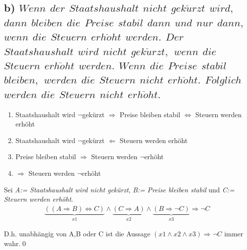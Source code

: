 \documentclass[titlepage]{article}
\newcommand{\1}{\mathbb{1}}
\newcommand{\0}{\mathbb{0}}
\begin{document}
		\subsection*{b) \textit{$Wenn$ $der$ $Staatshaushalt$ $nicht$ $gek\ddot urzt$ $wird,$ $dann$ $bleiben$ $die$ $Preise$ $stabil$ $dann$ $und$ $nur$ $dann,$ $wenn$ $die$ $Steuern$ $erh\ddot oht$ $werden.$ $Der$ $Staatshaushalt$ $wird$ $nicht$ $gek\ddot urzt,$ $wenn$ $die$ $Steuern$ $erh\ddot oht$ $werden.$ $Wenn$ $die$ $Preise$ $stabil$ $bleiben,$ $werden$ $die$ $Steuern$ $nicht$ $erh\ddot oht.$ $Folglich$ $werden$ $die$ $Steuern$ $nicht$ $erh\ddot oht.$}}
			\begin{enumerate}
				\item Staatshaushalt wird $\neg$gekürzt $\Rightarrow$ Preise bleiben stabil $\Leftrightarrow$ Steuern werden erhöht
				\item Staatshaushalt wird $\neg$gekürzt $\Leftarrow$ Steuern werden erhöht
				\item Preise bleiben stabil $\Rightarrow$ Steuern werden $\neg$erhöht
				\item $\Longrightarrow$ Steuern werden $\neg$erhöht
			\end{enumerate}
		Sei \textit{A:= Staatshaushalt wird nicht gekürzt}, \textit{B:= Preise bleiben stabil} und \textit{C:= Steuern werden erhöht}.
		\begin{align*}
			\underbrace{((A\Rightarrow B)\Leftrightarrow C)}_{x1}\wedge\underbrace{( C\Rightarrow A)}_{x2}\wedge\underbrace{(B\Rightarrow\neg C)}_{x3}\Rightarrow\neg C
		\end{align*}
		
		
			\begin{table}[h]
			\end{table}
		D.h. unabhängig von A,B oder C ist die Aussage $(x1\land x2\land x3)\Rightarrow\neg C$ immer wahr.\qed
	
\end{document}
